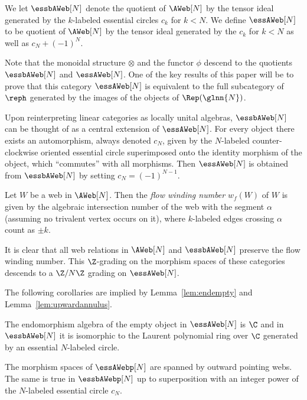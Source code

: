 \begin{defi} We let $\essbAWeb[N]$ denote the quotient of $\AWeb[N]$ by
the tensor ideal generated by the $k$-labeled essential circles $c_k$ for $k<N$. We
define $\essAWeb[N]$ to be quotient of $\AWeb[N]$ by the tensor ideal generated
by the $c_k$ for $k<N$ as well as $c_N+(-1)^N$. 
\end{defi} 

Note that the monoidal structure $\otimes$ and the functor $\phi$ descend to the
quotients $\essbAWeb[N]$ and $\essAWeb[N]$. One of the key results of this paper
will be to prove that this category $\essAWeb[N]$ is equivalent to the full
subcategory of $\reph$ generated by the images of the objects of
$\Rep(\glnn{N})$.

Upon reinterpreting linear categories as locally unital algebras, $\essbAWeb[N]$
can be thought of as a central extension of $\essAWeb[N]$. For every object
there exists an automorphism, always denoted $c_N$, given by the $N$-labeled
counter-clockwise oriented essential circle superimposed onto the identity
morphism of the object, which ``commutes'' with all morphisms. Then
$\essAWeb[N]$ is obtained from $\essbAWeb[N]$ by setting $c_N=(-1)^{N-1}$.

\begin{defi}\label{def:grading} Let $W$ be a web in $\AWeb[N]$. Then the
\emph{flow winding number} $w_f(W)$ of $W$ is given by the algebraic
intersection number of the web with the segment $\alpha$ (assuming no trivalent
vertex occurs on it), where $k$-labeled edges crossing $\alpha$ count as $\pm
k$.
\end{defi}
It is clear that all web relations in $\AWeb[N]$ and $\essbAWeb[N]$ preserve the
flow winding number. This $\Z$-grading on the morphism spaces of these
categories descends to a $\Z/N\Z$ grading on $\essAWeb[N]$.

The following corollaries are implied by Lemma~\ref{lem:endempty} and
Lemma~\ref{lem:upwardannulus}.


\begin{coro}\label{cor:end} The endomorphism algebra of the empty object in
$\essAWeb[N]$ is $\C$ and in $\essbAWeb[N]$ it is isomorphic to the Laurent
polynomial ring over $\C$ generated by an essential $N$-labeled circle. 
\end{coro}

\begin{coro}\label{cor:out} The morphism spaces of $\essAWebp[N]$ are
spanned by outward pointing webs. The same is true in $\essbAWebp[N]$ up to
superposition with an integer power of the $N$-labeled essential circle $c_N$.
\end{coro}



